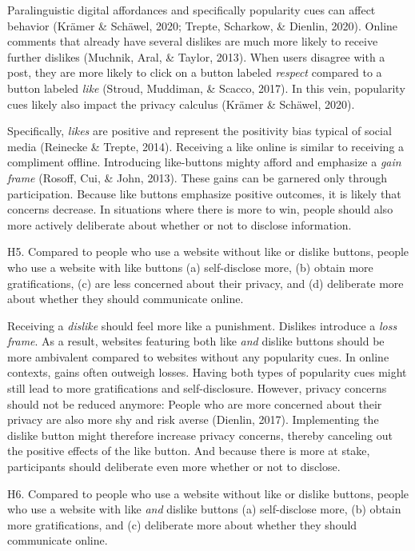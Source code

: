 \documentclass[
  english,
  man,floatsintext]{apa6}
\begin{document}
Paralinguistic digital affordances and specifically popularity cues can affect behavior (Krämer \& Schäwel, 2020; Trepte, Scharkow, \& Dienlin, 2020).
Online comments that already have several dislikes are much more likely to receive further dislikes (Muchnik, Aral, \& Taylor, 2013).
When users disagree with a post, they are more likely to click on a button labeled \emph{respect} compared to a button labeled \emph{like} (Stroud, Muddiman, \& Scacco, 2017).
In this vein, popularity cues likely also impact the privacy calculus (Krämer \& Schäwel, 2020).

Specifically, \emph{likes} are positive and represent the positivity bias typical of social media (Reinecke \& Trepte, 2014).
Receiving a like online is similar to receiving a compliment offline.
Introducing like-buttons mighty afford and emphasize a \emph{gain frame} (Rosoff, Cui, \& John, 2013).
These gains can be garnered only through participation.
Because like buttons emphasize positive outcomes, it is likely that concerns decrease.
In situations where there is more to win, people should also more actively deliberate about whether or not to disclose information.

H5. Compared to people who use a website without like or dislike buttons, people who use a website with like buttons (a) self-disclose more, (b) obtain more gratifications, (c) are less concerned about their privacy, and (d) deliberate more about whether they should communicate online.

Receiving a \emph{dislike} should feel more like a punishment.
Dislikes introduce a \emph{loss frame}.
As a result, websites featuring both like \emph{and} dislike buttons should be more ambivalent compared to websites without any popularity cues.
In online contexts, gains often outweigh losses.
Having both types of popularity cues might still lead to more gratifications and self-disclosure.
However, privacy concerns should not be reduced anymore:
People who are more concerned about their privacy are also more shy and risk averse (Dienlin, 2017).
Implementing the dislike button might therefore increase privacy concerns, thereby canceling out the positive effects of the like button.
And because there is more at stake, participants should deliberate even more whether or not to disclose.

H6. Compared to people who use a website without like or dislike buttons, people who use a website with like \emph{and} dislike buttons (a) self-disclose more, (b) obtain more gratifications, and (c) deliberate more about whether they should communicate online.
\end{document}

